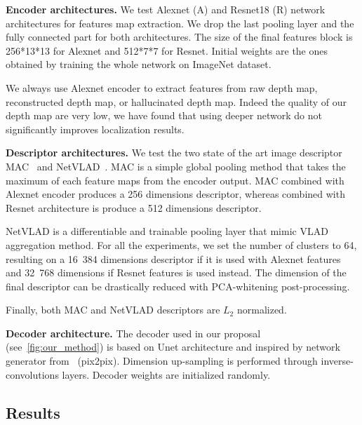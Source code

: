 \noindent\textbf{Encoder architectures.} We test Alexnet (A) and Resnet18 (R) network architectures for features map extraction. We drop the last pooling layer and the fully connected part for both architectures. The size of the final features block is 256*13*13 for Alexnet and 512*7*7 for Resnet. Initial weights are the ones obtained by training the whole network on ImageNet dataset.

We always use Alexnet encoder to extract features from raw depth map, reconstructed depth map, or hallucinated depth map. Indeed the quality of our depth map are very low, we have found that using deeper network do not significantly improves localization results.

\noindent\textbf{Descriptor architectures.} We test the two state of the art image descriptor MAC~\cite{Radenovic2017} and NetVLAD~\cite{Arandjelovic2017}. MAC is a simple global pooling method that takes the maximum of each feature maps from the encoder output. MAC combined with Alexnet encoder produces a 256 dimensions descriptor, whereas combined with Resnet architecture is produce a 512 dimensions descriptor.

NetVLAD is a differentiable and trainable pooling layer that mimic VLAD aggregation method. For all the experiments, we set the number of clusters to 64, resulting on a 16~384 dimensions descriptor if it is used with Alexnet features and 32~768 dimensions if Resnet features is used instead. The dimension of the final descriptor can be drastically reduced with PCA-whitening post-processing.

Finally, both MAC and NetVLAD descriptors are $L_{2}$ normalized.

\noindent\textbf{Decoder architecture.} The decoder used in our proposal (see~\ref{fig:our_method}) is based on Unet architecture and inspired by network generator from~\cite{} (pix2pix). Dimension up-sampling is performed through inverse-convolutions layers. Decoder weights are initialized randomly.

\subsection{Results}
\label{subsec:results}

